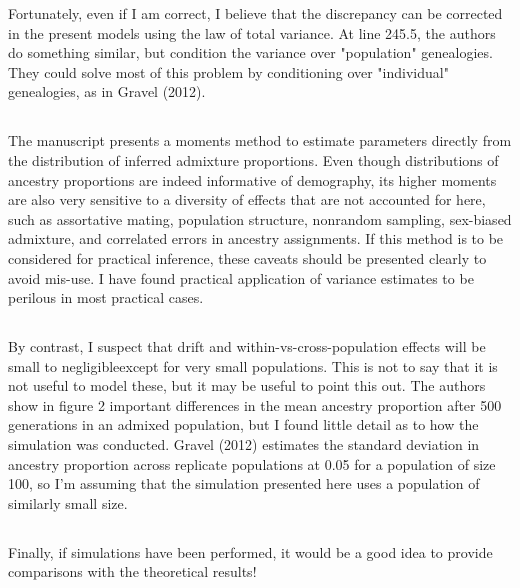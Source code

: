\documentclass[11pt]{amsart}
\begin{document}
Fortunately, even if I am correct, I believe that the discrepancy can be corrected in the present models
using the law of total variance. At line 245.5, the authors do something similar, but condition the variance
over "population" genealogies. They could solve most of this problem by conditioning over "individual"
genealogies, as in Gravel (2012).

\subsection{}
The manuscript presents a moments method to estimate parameters directly from the distribution of
inferred admixture proportions. Even though distributions of ancestry proportions are indeed informative
of demography, its higher moments are also very sensitive to a diversity of effects that are not accounted
for here, such as assortative mating, population structure, nonrandom sampling, sex-biased admixture,
and correlated errors in ancestry assignments. If this method is to be considered for practical inference,
these caveats should be presented clearly to avoid mis-use. I have found practical application of variance
estimates to be perilous in most practical cases.

\subsection{}
By contrast, I suspect that drift and within-vs-cross-population effects will be small to negligibleexcept
for very small populations. This is not to say that it is not useful to model these, but it may be useful to
point this out. The authors show in figure 2 important differences in the mean ancestry proportion after
500 generations in an admixed population, but I found little detail as to how the simulation was
conducted. Gravel (2012) estimates the standard deviation in ancestry proportion across replicate
populations at 0.05 for a population of size 100, so I'm assuming that the simulation presented here uses
a population of similarly small size.

\subsection{}
Finally, if simulations have been performed, it would be a good idea to provide comparisons with the
theoretical results!
\end{document}

